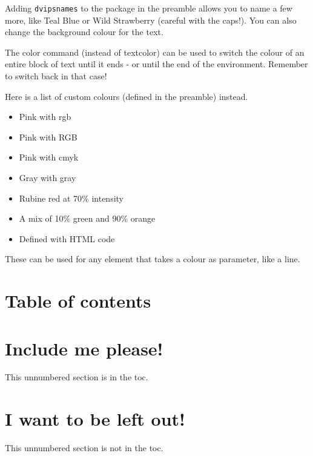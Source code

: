 \documentclass[12pt, letterpaper]{article} %
\begin{document}
Adding \texttt{dvipsnames} to the package in the preamble allows you to name a few more, like \textcolor{TealBlue}{Teal Blue} or \textcolor{WildStrawberry}{Wild Strawberry} (careful with the caps!). You can also change \colorbox{BurntOrange}{the background colour} for the text.

The color command (instead of textcolor) can be used \color{cyan}to switch the colour of an entire block of text until it ends - or until the end of the environment. Remember to \color{black} switch back in that case!

Here is a list of custom colours (defined in the preamble) instead.
\begin{itemize}
	\item \textcolor{mypink1}{Pink with rgb}
	\item \textcolor{mypink2}{Pink with RGB}
	\item \textcolor{mypink3}{Pink with cmyk}
	\item \textcolor{mygray}{Gray with gray}
	\item \textcolor{LightRubineRed}{Rubine red at 70\% intensity} %
	\item \textcolor{OrangeGreen}{A mix of 10\% green and 90\% orange}
	\item \textcolor{HTMLColor}{Defined with HTML code}
\end{itemize}

These can be used for any element that takes a colour as parameter, like a line.

\noindent {\color{TealBlue} \rule{\linewidth}{1mm}} %

\clearpage
\section{Table of contents}

\tableofcontents


\section*{Include me please!}

This unnumbered section is in the toc.

\section*{I want to be left out!}

This unnumbered section is not in the toc.
\end{document}
